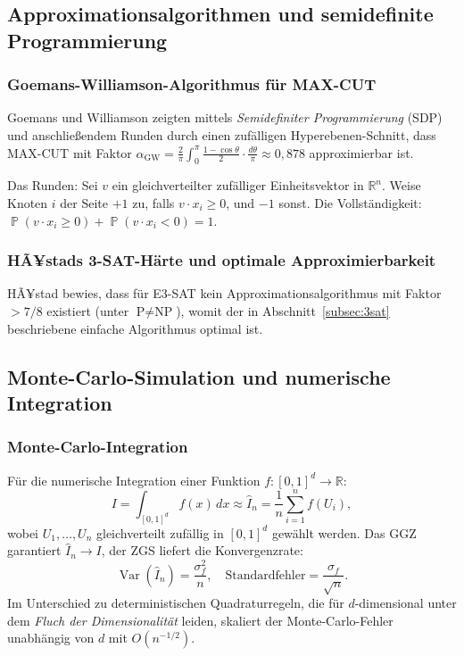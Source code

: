 ﻿\documentclass[12pt,a4paper]{article}
\theoremstyle{definition}
\theoremstyle{plain}
\theoremstyle{remark}
\DeclareMathOperator{\Var}{Var}
\DeclareMathOperator{\Prob}{\mathbb{P}}
\begin{document}
\subsection{Approximationsalgorithmen und semidefinite Programmierung}

\subsubsection{Goemans-Williamson-Algorithmus für MAX-CUT}
Goemans und Williamson \cite{goemans1995improved} zeigten mittels
\emph{Semidefiniter Programmierung} (SDP) und anschließendem
Runden durch einen zufälligen Hyperebenen-Schnitt, dass MAX-CUT mit
Faktor $\alpha_{\text{GW}} = \frac{2}{\pi}\int_0^\pi \frac{1-\cos\theta}{2}
\cdot \frac{d\theta}{\pi} \approx 0{,}878$ approximierbar ist.

Das Runden: Sei $v$ ein gleichverteilter zufälliger Einheitsvektor in $\mathbb{R}^n$.
Weise Knoten $i$ der Seite $+1$ zu, falls $v \cdot x_i \geq 0$, und $-1$ sonst.
Die Vollständigkeit: $\Prob(v \cdot x_i \geq 0) + \Prob(v \cdot x_i < 0) = 1$.

\subsubsection{HÃ¥stads 3-SAT-Härte und optimale Approximierbarkeit}
HÃ¥stad \cite{hastad2001some} bewies, dass für E3-SAT kein Approximationsalgorithmus
mit Faktor $> 7/8$ existiert (unter $\text{P}\neq\text{NP}$), womit der
in Abschnitt~\ref{subsec:3sat} beschriebene einfache Algorithmus optimal ist.

\subsection{Monte-Carlo-Simulation und numerische Integration}

\subsubsection{Monte-Carlo-Integration}
Für die numerische Integration einer Funktion $f: [0,1]^d \to \mathbb{R}$:
\[
  I = \int_{[0,1]^d} f(x)\,dx \approx \hat{I}_n = \frac{1}{n}\sum_{i=1}^n f(U_i),
\]
wobei $U_1, \ldots, U_n$ gleichverteilt zufällig in $[0,1]^d$ gewählt werden.
Das GGZ garantiert $\hat{I}_n \to I$, der ZGS liefert die Konvergenzrate:
\[
  \Var(\hat{I}_n) = \frac{\sigma^2_f}{n}, \quad
  \text{Standardfehler} = \frac{\sigma_f}{\sqrt{n}}.
\]
Im Unterschied zu deterministischen Quadraturregeln, die für $d$-dimensional
unter dem \emph{Fluch der Dimensionalität} leiden, skaliert der
Monte-Carlo-Fehler unabhängig von $d$ mit $O(n^{-1/2})$.
\end{document}
